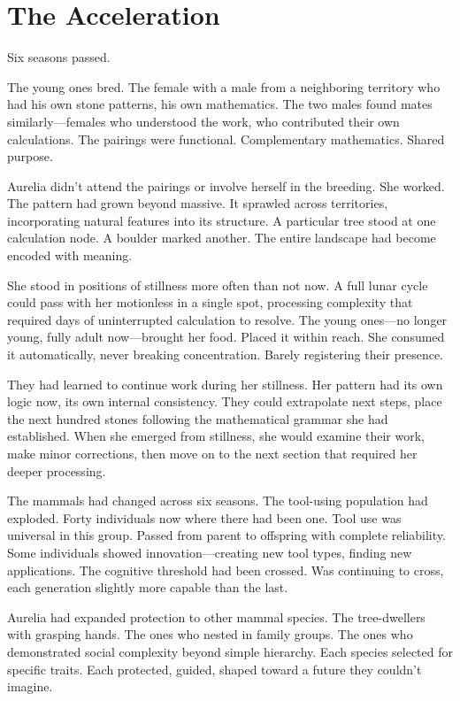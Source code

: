 \chapter{The Acceleration}
\label{ch:08}


Six seasons passed.

The young ones bred. The female with a male from a neighboring territory who had his own stone patterns, his own mathematics. The two males found mates similarly—females who understood the work, who contributed their own calculations. The pairings were functional. Complementary mathematics. Shared purpose.

Aurelia didn't attend the pairings or involve herself in the breeding. She worked. The pattern had grown beyond massive. It sprawled across territories, incorporating natural features into its structure. A particular tree stood at one calculation node. A boulder marked another. The entire landscape had become encoded with meaning.

She stood in positions of stillness more often than not now. A full lunar cycle could pass with her motionless in a single spot, processing complexity that required days of uninterrupted calculation to resolve. The young ones—no longer young, fully adult now—brought her food. Placed it within reach. She consumed it automatically, never breaking concentration. Barely registering their presence.

They had learned to continue work during her stillness. Her pattern had its own logic now, its own internal consistency. They could extrapolate next steps, place the next hundred stones following the mathematical grammar she had established. When she emerged from stillness, she would examine their work, make minor corrections, then move on to the next section that required her deeper processing.

The mammals had changed across six seasons. The tool-using population had exploded. Forty individuals now where there had been one. Tool use was universal in this group. Passed from parent to offspring with complete reliability. Some individuals showed innovation—creating new tool types, finding new applications. The cognitive threshold had been crossed. Was continuing to cross, each generation slightly more capable than the last.

Aurelia had expanded protection to other mammal species. The tree-dwellers with grasping hands. The ones who nested in family groups. The ones who demonstrated social complexity beyond simple hierarchy. Each species selected for specific traits. Each protected, guided, shaped toward a future they couldn't imagine.

